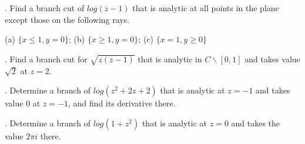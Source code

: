 . Find a branch cut of $ log (z-1)$ that is analytic at all points in the plane except those on the following rays.

(a) $ \{ x\leq 1, y=0 \}$; (b) $ \{ x \geq 1, y=0 \}$; (c) $\{ x=1, y \geq 0 \}$


\medskip




\medskip


. Find a branch cut for $\sqrt{z (z-1)}$ that is analytic in $ C \backslash [0, 1]$ and takes value $ \sqrt{2} $ at $z=2$.

\medskip


. Determine a branch of $ log (z^2+2z+2)$ that is analytic at $z=-1$ and takes value $ 0$ at $z=-1$, and find its derivative there.


\medskip

. Determine a branch of $log (1+z^2)$ that is analytic at $z=0$ and takes the value $2 \pi i$ there.












